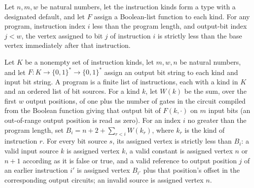 \begin{theorem}
\label{BoolCircuit.progVertex_lt}
\leanok
{}
Let $n,m,w$ be natural numbers, let the instruction kinds form a type with a designated
default, and let $F$ assign a Boolean-list function to each kind. For any program,
instruction index $i$ less than the program length, and output-bit index $j<w$, the
vertex assigned to bit $j$ of instruction $i$ is strictly less than the base vertex
immediately after that instruction.
\end{theorem}

\begin{theorem}
\label{BoolCircuit.srcVertex_lt}
\leanok
{}
Let $K$ be a nonempty set of instruction kinds, let $m,w,n$ be natural numbers, and let
$F:K\to\{0,1\}^*\to\{0,1\}^*$ assign an output bit string to each kind and input bit
string. A program is a finite list of instructions, each with a kind in $K$ and an
ordered list of bit sources. For a kind $k$, let $W(k)$ be the sum, over the first $w$
output positions, of one plus the number of gates in the circuit compiled from the
Boolean function giving that output bit of $F(k,\cdot)$ on $m$ input bits (an
out-of-range output position is read as zero). For an index $i$ no greater than the
program length, set $B_i=n+2+\sum_{r<i}W(k_r)$, where $k_r$ is the kind of instruction
$r$. For every bit source $s$, its assigned vertex is strictly less than $B_i$: a valid
input source $k$ is assigned vertex $k$, a valid constant is assigned vertex $n$ or
$n+1$ according as it is false or true, and a valid reference to output position $j$ of
an earlier instruction $i'$ is assigned vertex $B_{i'}$ plus that position's offset in
the corresponding output circuits; an invalid source is assigned vertex $n$.
\end{theorem}

